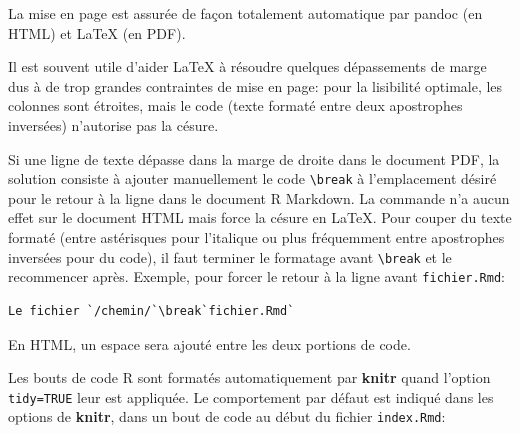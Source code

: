 \documentclass[
  12pt,
  french,
  a4paper,
  extrafontsizes,onecolumn,openright
  ]{memoir}
\newenvironment{Shaded}{\begin{snugshade}}{\end{snugshade}}
\newcommand{\AttributeTok}[1]{\textcolor[rgb]{0.13,0.29,0.53}{#1}}
\newcommand{\CommentTok}[1]{\textcolor[rgb]{0.56,0.35,0.01}{\textit{#1}}}
\newcommand{\ConstantTok}[1]{\textcolor[rgb]{0.56,0.35,0.01}{#1}}
\newcommand{\DecValTok}[1]{\textcolor[rgb]{0.00,0.00,0.81}{#1}}
\newcommand{\FunctionTok}[1]{\textcolor[rgb]{0.13,0.29,0.53}{\textbf{#1}}}
\newcommand{\NormalTok}[1]{#1}
\newcommand{\SpecialCharTok}[1]{\textcolor[rgb]{0.81,0.36,0.00}{\textbf{#1}}}
\newcommand{\StringTok}[1]{\textcolor[rgb]{0.31,0.60,0.02}{#1}}
\begin{document}
La mise en page est assurée de façon totalement automatique par pandoc (en HTML) et LaTeX (en PDF).

Il est souvent utile d'aider LaTeX à résoudre quelques dépassements de marge dus à de trop grandes contraintes de mise en page: pour la lisibilité optimale, les colonnes sont étroites, mais le code (texte formaté entre deux apostrophes inversées) n'autorise pas la césure.

Si une ligne de texte dépasse dans la marge de droite dans le document PDF, la solution consiste à ajouter manuellement le code \texttt{\textbackslash{}break} à l'emplacement désiré pour le retour à la ligne dans le document R Markdown.
La commande n'a aucun effet sur le document HTML mais force la césure en LaTeX.
Pour couper du texte formaté (entre astérisques pour l'italique ou plus fréquemment entre apostrophes inversées pour du code), il faut terminer le formatage avant \texttt{\textbackslash{}break} et le recommencer après.
Exemple, pour forcer le retour à la ligne avant \texttt{fichier.Rmd}:

\begin{verbatim}
Le fichier `/chemin/`\break`fichier.Rmd`
\end{verbatim}

En HTML, un espace sera ajouté entre les deux portions de code.

Les bouts de code R sont formatés automatiquement par \textbf{knitr} quand l'option \texttt{tidy=TRUE} leur est appliquée.
Le comportement par défaut est indiqué dans les options de \textbf{knitr}, dans un bout de code au début du fichier \texttt{index.Rmd}:

\scriptsize

\begin{Shaded}
\end{Shaded}
\end{document}
